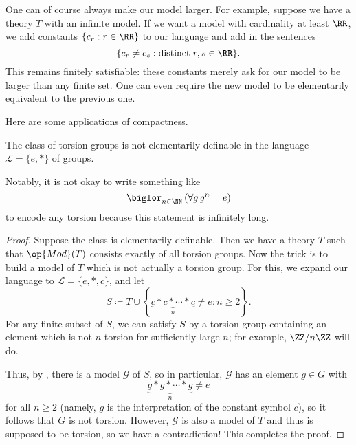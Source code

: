 \documentclass[../notes.tex]{subfiles}
\begin{document}
\begin{remark}
	One can of course always make our model larger. For example, suppose we have a theory $T$ with an infinite model. If we want a model with cardinality at least $\RR$, we add constants $\{c_r:r\in\RR\}$ to our language and add in the sentences
	\[\{c_r\ne c_s:\text{distinct }r,s\in\RR\}.\]
	This remains finitely satisfiable: these constants merely ask for our model to be larger than any finite set. One can even require the new model to be elementarily equivalent to the previous one.
\end{remark}
Here are some applications of compactness.
\begin{corollary} \label{cor:tors-not-elem}
	The class of torsion groups is not elementarily definable in the language $\mathcal L=\{e,*\}$ of groups.
\end{corollary}
Notably, it is not okay to write something like
\[\biglor_{n\in\NN}\left(\forall g\,g^n=e\right)\]
to encode any torsion because this statement is infinitely long.
\begin{proof}
	Suppose the class is elementarily definable. Then we have a theory $T$ such that $\op{Mod}(T)$ consists exactly of all torsion groups. Now the trick is to build a model of $T$ which is not actually a torsion group. For this, we expand our language to $\mathcal L=\{e,*,c\}$, and let
	\[S\coloneqq T\cup\left\{\underbrace{c*c*\cdots*c}_n\ne e:n\ge2\right\}.\]
	For any finite subset of $S$, we can satisfy $S$ by a torsion group containing an element which is not $n$-torsion for sufficiently large $n$; for example, $\ZZ/n\ZZ$ will do.

	Thus, by , there is a model $\mathcal G$ of $S$, so in particular, $\mathcal G$ has an element $g\in G$ with
	\[\underbrace{g*g*\cdots*g}_n\ne e\]
	for all $n\ge 2$ (namely, $g$ is the interpretation of the constant symbol $c$), so it follows that $G$ is not torsion. However, $\mathcal G$ is also a model of $T$ and thus is supposed to be torsion, so we have a contradiction! This completes the proof.
\end{proof}
\end{document}
